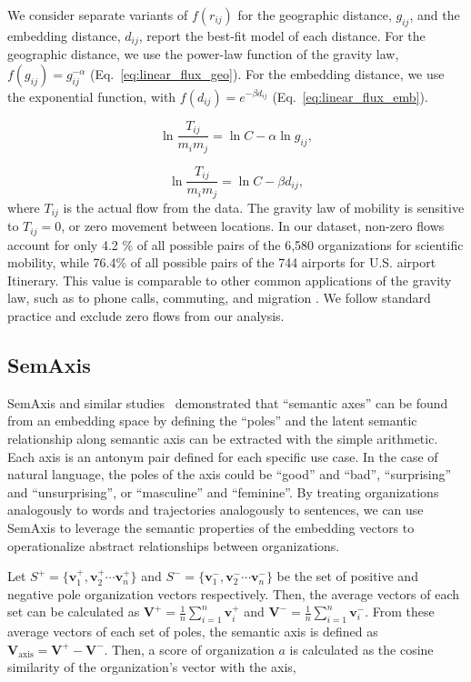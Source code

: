 \documentclass[12pt]{article} %
\begin{document}
We consider separate variants of $f(r_{ij})$ for the geographic distance, $g_{ij}$, and the embedding distance, $d_{ij}$, report the best-fit model of each distance.
For the geographic distance, we use the power-law function of the gravity law, $f(g_{ij})= g^{-\alpha}_{ij}$ (Eq.~\ref{eq:linear_flux_geo}).
For the embedding distance, we use the exponential function, with $f(d_{ij}) = e^{-\beta d_{ij}}$ (Eq.~\ref{eq:linear_flux_emb}).

\begin{equation}
	\label{eq:linear_flux_geo}
	\ln\frac{T_{ij}}{m_im_j} = \ln C  - \alpha \ln g_{ij},
\end{equation}

\begin{equation}
	\label{eq:linear_flux_emb}
	\ln\frac{T_{ij}}{m_im_j} = \ln C - \beta d_{ij},
\end{equation}
where $T_{ij}$ is the actual flow from the data. 
The gravity law of mobility is sensitive to $T_{ij} = 0$, or zero movement  between locations.
In our dataset, non-zero flows account for only 4.2 \% of all possible pairs of the 6,580 organizations for scientific mobility, while 76.4\% of all possible pairs of the 744 airports for U.S. airport Itinerary.
This value is comparable to other common applications of the gravity law, such as to phone calls, commuting, and migration \autocite{simini2012universal}.
We follow standard practice and exclude zero flows from our analysis.



%
%
\subsection*{SemAxis}
SemAxis and similar studies~\autocite{an2018semaxis, nakandala2017gendered, kozlowski2018geometry} demonstrated that ``semantic axes'' can be found from an embedding space by defining the ``poles'' and the latent semantic relationship along semantic axis can be extracted with the simple arithmetic.
Each axis is an antonym pair defined for each specific use case.
In the case of natural language, the poles of the axis could be ``good'' and ``bad'', ``surprising'' and ``unsurprising'', or ``masculine'' and ``feminine''.
By treating organizations analogously to words and trajectories analogously to sentences, we can use SemAxis to leverage the semantic properties of the embedding vectors to operationalize abstract relationships between organizations.

 Let $S^+ = \{\bm{v}_1^+, \bm{v}_2^+ \cdots \bm{v}_n^+\}$ and $S^- =\{\bm{v}_1^-, \bm{v}_2^- \cdots \bm{v}_n^-\}$ be the set of positive and negative pole organization vectors respectively. 
Then, the average vectors of each set can be calculated as $\bm{V}^{+} = \frac{1}{n}\sum^n_{i=1} \bm{v}_i^+$ and $\bm{V}^{-} = \frac{1}{n}\sum^n_{i=1} \bm{v}_i^-$. 
From these average vectors of each set of poles, the semantic axis is defined as $\bm{V}_{\text{axis}} = \bm{V}^{+} - \bm{V}^{-}$. Then,  a score of organization $a$ is calculated as the cosine similarity of the organization's vector with the axis,
\end{document}
